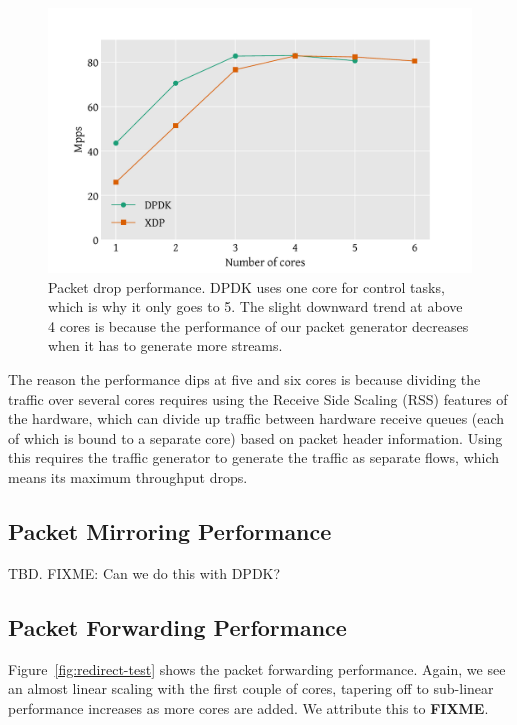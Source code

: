 \documentclass[10pt,sigconf]{acmart}
\begin{document}
\begin{figure}[t]
\centering
\includegraphics[width=\linewidth]{figures/drop-test.pdf}
\caption{\label{fig:drop-test} Packet drop performance. DPDK uses one core for
  control tasks, which is why it only goes to 5. The slight downward trend at
  above 4 cores is because the performance of our packet generator decreases
  when it has to generate more streams.}
\end{figure}


The reason the performance dips at five and six cores is because dividing the
traffic over several cores requires using the Receive Side Scaling (RSS)
features of the hardware, which can divide up traffic between hardware receive
queues (each of which is bound to a separate core) based on packet header
information. Using this requires the traffic generator to generate the traffic
as separate flows, which means its maximum throughput drops.

\subsection{Packet Mirroring Performance}
\label{sec:pack-mirr-perf}

TBD. FIXME: Can we do this with DPDK?

\subsection{Packet Forwarding Performance}
\label{sec:pack-forw-perf}
Figure~\ref{fig:redirect-test} shows the packet forwarding performance. Again,
we see an almost linear scaling with the first couple of cores, tapering off to
sub-linear performance increases as more cores are added. We attribute this to
\textbf{FIXME}.
\end{document}
